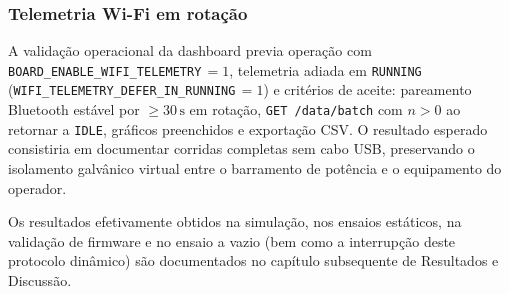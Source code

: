 \subsubsection{Telemetria Wi-Fi em rotação}

A validação operacional da dashboard previa operação com \texttt{BOARD\_ENABLE\_WIFI\_TELEMETRY}\,$= 1$, telemetria adiada em \texttt{RUNNING} (\texttt{WIFI\_TELEMETRY\_DEFER\_IN\_RUNNING}\,$= 1$) e critérios de aceite: pareamento Bluetooth estável por $\geq 30\,\text{s}$ em rotação, \texttt{GET /data/batch} com $n > 0$ ao retornar a \texttt{IDLE}, gráficos preenchidos e exportação CSV. O resultado esperado consistiria em documentar corridas completas sem cabo USB, preservando o isolamento galvânico virtual entre o barramento de potência e o equipamento do operador.

Os resultados efetivamente obtidos na simulação, nos ensaios estáticos, na validação de firmware e no ensaio a vazio (bem como a interrupção deste protocolo dinâmico) são documentados no capítulo subsequente de Resultados e Discussão.
